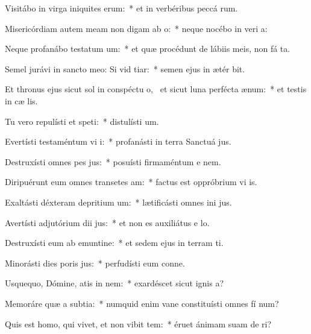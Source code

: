 \item Visitábo in virga iniquites erum:~* et in verbéribus peccá rum.
\item Misericórdiam autem meam non digam ab o:~* neque nocébo in veri a:
\item Neque profanábo testatum um:~* et quæ procédunt de lábiis meis, non fá ta.
\item Semel jurávi in sancto meo: Si vid tiar:~* semen ejus in ætér bit.
\item Et thronus ejus sicut sol in conspéctu o,~\pscross{} et sicut luna perfécta  ænum:~* et testis in cæ lis.
\item Tu vero repulísti et speti:~* distulísti  um.
\item Evertísti testaméntum vi i:~* profanásti in terra Sanctuá jus.
\item Destruxísti omnes pes jus:~* posuísti firmaméntum e nem.
\item Diripuérunt eum omnes transetes am:~* factus est oppróbrium vi is.
\item Exaltásti déxteram depritium um:~* lætificásti omnes ini jus.
\item Avertísti adjutórium dii jus:~* et non es auxiliátus e  lo.
\item Destruxísti eum ab emuntine:~* et sedem ejus in terram ti.
\item Minorásti dies poris jus:~* perfudísti eum conne.
\item Usquequo, Dómine, atis in nem:~* exardéscet sicut ignis  a?
\item Memoráre quæ a subtia:~* numquid enim vane constituísti omnes fí num?
\item Quis est homo, qui vivet, et non vibit tem:~* éruet ánimam suam de  ri?
